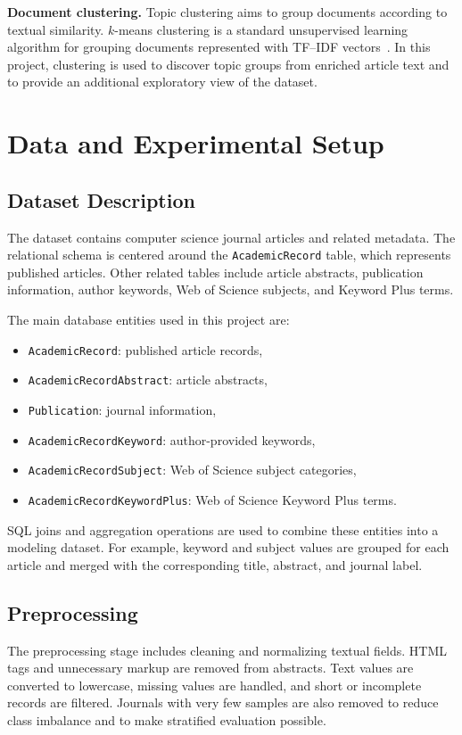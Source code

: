 \documentclass[conference]{IEEEtran}
\begin{document}
\textbf{Document clustering.}
Topic clustering aims to group documents according to textual similarity. $k$-means clustering is a standard unsupervised learning algorithm for grouping documents represented with TF--IDF vectors~\cite{steinbach2000}. In this project, clustering is used to discover topic groups from enriched article text and to provide an additional exploratory view of the dataset.

\section{Data and Experimental Setup}

\subsection{Dataset Description}
The dataset contains computer science journal articles and related metadata. The relational schema is centered around the \texttt{AcademicRecord} table, which represents published articles. Other related tables include article abstracts, publication information, author keywords, Web of Science subjects, and Keyword Plus terms.

The main database entities used in this project are:

\begin{itemize}
    \item \texttt{AcademicRecord}: published article records,
    \item \texttt{AcademicRecordAbstract}: article abstracts,
    \item \texttt{Publication}: journal information,
    \item \texttt{AcademicRecordKeyword}: author-provided keywords,
    \item \texttt{AcademicRecordSubject}: Web of Science subject categories,
    \item \texttt{AcademicRecordKeywordPlus}: Web of Science Keyword Plus terms.
\end{itemize}

SQL joins and aggregation operations are used to combine these entities into a modeling dataset. For example, keyword and subject values are grouped for each article and merged with the corresponding title, abstract, and journal label.

\subsection{Preprocessing}
The preprocessing stage includes cleaning and normalizing textual fields. HTML tags and unnecessary markup are removed from abstracts. Text values are converted to lowercase, missing values are handled, and short or incomplete records are filtered. Journals with very few samples are also removed to reduce class imbalance and to make stratified evaluation possible.
\end{document}
